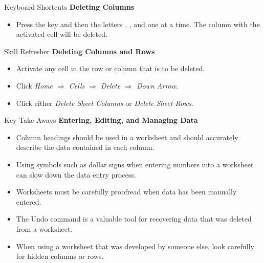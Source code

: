 \begin{center}
	\begin{shtcutbox}{Keyboard Shortcuts}
		\textbf{Deleting Columns}
		\\
		\begin{itemize}
			\setlength{\itemsep}{0pt}
			\setlength{\parskip}{0pt}
			\setlength{\parsep}{0pt}
			
			\item Press the  key and then the letters , , and  one at a time. The column with the activated cell will be deleted.
			
		\end{itemize}
	\end{shtcutbox}
\end{center}

\begin{center}
	\begin{sklbox}{Skill Refresher}
		\textbf{Deleting Columns and Rows}
		\\
		\begin{itemize}
			\setlength{\itemsep}{0pt}
			\setlength{\parskip}{0pt}
			\setlength{\parsep}{0pt}
			
			\item Activate any cell in the row or column that is to be deleted.
			\item Click \textit{Home $ \Rightarrow $ Cells $ \Rightarrow $ Delete $ \Rightarrow $ Down Arrow}.
			\item Click either \textit{Delete Sheet Columns} or \textit{Delete Sheet Rows}.
			
		\end{itemize}
	\end{sklbox}
\end{center}

\begin{center}
	\begin{tkwbox}{Key Take-Aways}
		\textbf{Entering, Editing, and Managing Data}
		\\
		\begin{itemize}
			\setlength{\itemsep}{0pt}
			\setlength{\parskip}{0pt}
			\setlength{\parsep}{0pt}
			
			\item Column headings should be used in a worksheet and should accurately describe the data contained in each column.
			\item Using symbols such as dollar signs when entering numbers into a worksheet can slow down the data entry process.
			\item Worksheets must be carefully proofread when data has been manually entered.
			\item The Undo command is a valuable tool for recovering data that was deleted from a worksheet.
			\item When using a worksheet that was developed by someone else, look carefully for hidden columns or rows.
			
		\end{itemize}
	\end{tkwbox}
\end{center}

